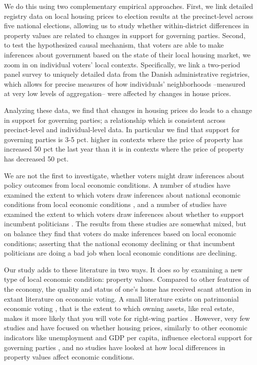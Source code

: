 \documentclass[12pt,a4paper]{article}
\begin{document}
We do this using two complementary empirical approaches. First, we link detailed registry data on local housing prices to election results at the precinct-level across five national elections, allowing us to study whether within-district differences in property values are related to changes in support for governing parties. Second, to test the hypothesized causal mechanism, that voters are able to make inferences about government based on the state of their local housing market, we zoom in on individual voters’ local contexts. Specifically, we link a two-period panel survey to uniquely detailed data from the Danish administrative registries, which allows for precise measures of how individuals’ neighborhoods --measured at very low levels of aggregation-- were affected by changes in house prices.

Analyzing these data, we find that changes in housing prices do leads to a change in support for governing parties; a relationship which is consistent across precinct-level and individual-level data. In particular we find that support for governing parties is 3-5 pct. higher in contexts where the price of property has increased 50 pct the last year than it is in contexts where the price of property has decreased 50 pct.

We are not the first to investigate, whether voters might draw inferences about policy outcomes from local economic conditions. A number of studies have examined the extent to which voters draw inferences about national economic conditions from local economic conditions \citep{books1999contextual,reeves2012ecologies,anderson2011local,ansolabehere2014mecro,dinesen2015reconsidering}, and a number of studies have examined the extent to which voters draw inferences about whether to support incumbent politicians  \citep{hansford2015reevaluating,eisenberg2004economic,kim2003spatial,healy2014presidential}. The results from these studies are somewhat mixed, but on balance they find that voters do make inferences based on local economic conditions; asserting that the national economy declining or that incumbent politicians are doing a bad job when local economic conditions are declining. 

Our study adds to these literature in two ways. It does so by examining a new type of local economic condition: property values. Compared to other features of the economy, the quality and status of one's home has received scant attention in extant literature on economic voting. A small literature exists on patrimonial economic voting \citep{nadeau2010patrimonial,stubager2013reaching}, that is the extent to which owning assets, like real estate, makes it more likely that you will vote for right-wing parties \citep[see][for a similar argument]{ansell2014political}. However, very few studies and have focused on whether housing prices, similarly to other economic indicators like unemployment and GDP per capita, influence electoral support for governing parties \citep[e.g.][]{hopkins2015economic}, and no studies have looked at how local differences in property values affect economic conditions.
\end{document}

